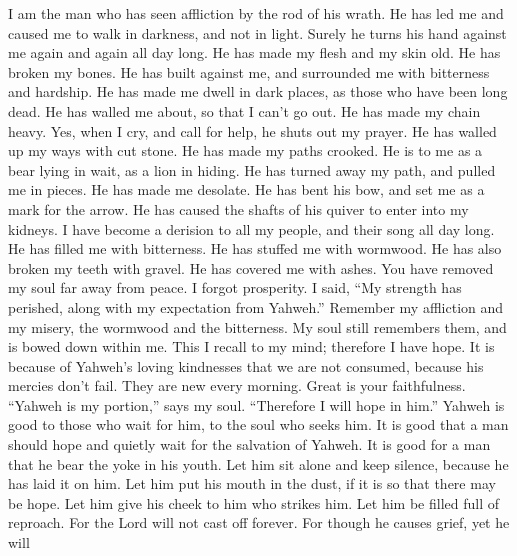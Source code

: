  I am the man who has seen affliction by the rod of his
wrath.  He has led me and caused me to walk in darkness,
and not in light.  Surely he turns his hand against me
again and again all day long.  He has made my flesh and my
skin old. He has broken my bones.  He has built against
me, and surrounded me with bitterness and hardship.  He
has made me dwell in dark places, as those who have been long dead.
 He has walled me about, so that I can't go out. He has
made my chain heavy.  Yes, when I cry, and call for help,
he shuts out my prayer.  He has walled up my ways with cut
stone. He has made my paths crooked.  He is to me as a
bear lying in wait, as a lion in hiding.  He has turned
away my path, and pulled me in pieces. He has made me desolate.
 He has bent his bow, and set me as a mark for the arrow.
 He has caused the shafts of his quiver to enter into my
kidneys.  I have become a derision to all my people, and
their song all day long.  He has filled me with
bitterness. He has stuffed me with wormwood.  He has also
broken my teeth with gravel. He has covered me with ashes.
 You have removed my soul far away from peace. I forgot
prosperity.  I said, ``My strength has perished, along
with my expectation from Yahweh.''  Remember my
affliction and my misery, the wormwood and the bitterness.
 My soul still remembers them, and is bowed down within
me.  This I recall to my mind; therefore I have hope.
 It is because of Yahweh's loving kindnesses that we are
not consumed, because his mercies don't fail.  They are
new every morning. Great is your faithfulness.  ``Yahweh
is my portion,'' says my soul. ``Therefore I will hope in him.''
 Yahweh is good to those who wait for him, to the soul
who seeks him.  It is good that a man should hope and
quietly wait for the salvation of Yahweh.  It is good for
a man that he bear the yoke in his youth.  Let him sit
alone and keep silence, because he has laid it on him. 
Let him put his mouth in the dust, if it is so that there may be hope.
 Let him give his cheek to him who strikes him. Let him
be filled full of reproach.  For the Lord will not cast
off forever.  For though he causes grief, yet he will

